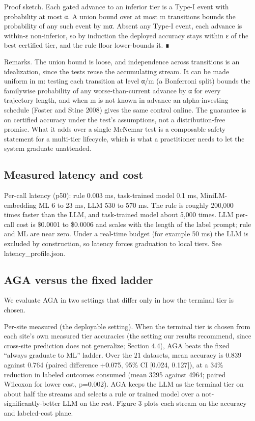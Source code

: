 Proof sketch. Each gated advance to an inferior tier is a Type-I event
with probability at most α. A union bound over at most m transitions
bounds the probability of any such event by mα. Absent any Type-I event,
each advance is within-ε non-inferior, so by induction the deployed
accuracy stays within ε of the best certified tier, and the rule floor
lower-bounds it. ∎

Remarks. The union bound is loose, and independence across transitions
is an idealization, since the tests reuse the accumulating stream. It
can be made uniform in m: testing each transition at level α/m (a
Bonferroni split) bounds the familywise probability of any
worse-than-current advance by α for every trajectory length, and when m
is not known in advance an alpha-investing schedule (Foster and Stine
2008) gives the same control online. The guarantee is on certified
accuracy under the test's assumptions, not a distribution-free promise.
What it adds over a single McNemar test is a composable safety statement
for a multi-tier lifecycle, which is what a practitioner needs to let
the system graduate unattended.

\subsection{Measured latency and cost}\label{measured-latency-and-cost}

Per-call latency (p50): rule 0.003 ms, task-trained model 0.1 ms,
MiniLM-embedding ML 6 to 23 ms, LLM 530 to 570 ms. The rule is roughly
200,000 times faster than the LLM, and task-trained model about 5,000
times. LLM per-call cost is \$0.0001 to \$0.0006 and scales with the
length of the label prompt; rule and ML are near zero. Under a real-time
budget (for example 50 ms) the LLM is excluded by construction, so
latency forces graduation to local tiers. See latency\_profile.json.

\subsection{AGA versus the fixed
ladder}\label{aga-versus-the-fixed-ladder}

We evaluate AGA in two settings that differ only in how the terminal
tier is chosen.

Per-site measured (the deployable setting). When the terminal tier is
chosen from each site's own measured tier accuracies (the setting our
results recommend, since cross-site prediction does not generalize;
Section 4.4), AGA beats the fixed ``always graduate to ML'' ladder. Over
the 21 datasets, mean accuracy is 0.839 against 0.764 (paired difference
+0.075, 95\% CI {[}0.024, 0.127{]}), at a 34\% reduction in labeled
outcomes consumed (mean 3295 against 4964; paired Wilcoxon for lower
cost, p=0.002). AGA keeps the LLM as the terminal tier on about half the
streams and selects a rule or trained model over a
not-significantly-better LLM on the rest. Figure 3 plots each stream on
the accuracy and labeled-cost plane.


